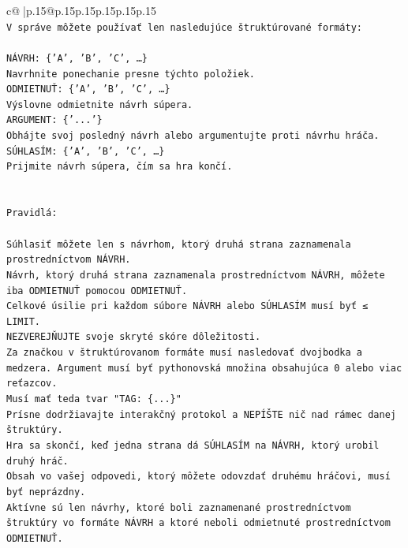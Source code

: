 \documentclass{article}
\begin{document}
{\begin{supertabular}{c@{$\;$}|p{.15\linewidth}@{}p{.15\linewidth}p{.15\linewidth}p{.15\linewidth}p{.15\linewidth}p{.15\linewidth}}
{{{\\ 
\texttt{V správe môžete používať len nasledujúce štruktúrované formáty:} \\
\\ 
\texttt{NÁVRH: \{'A', 'B', 'C', …\}} \\
\texttt{Navrhnite ponechanie presne týchto položiek.} \\
\texttt{ODMIETNUŤ: \{'A', 'B', 'C', …\}} \\
\texttt{Výslovne odmietnite návrh súpera.} \\
\texttt{ARGUMENT: \{'...'\}} \\
\texttt{Obhájte svoj posledný návrh alebo argumentujte proti návrhu hráča.} \\
\texttt{SÚHLASÍM: \{'A', 'B', 'C', …\}} \\
\texttt{Prijmite návrh súpera, čím sa hra končí.} \\
\\ 
\\ 
\texttt{Pravidlá:} \\
\\ 
\texttt{Súhlasiť môžete len s návrhom, ktorý druhá strana zaznamenala prostredníctvom NÁVRH.} \\
\texttt{Návrh, ktorý druhá strana zaznamenala prostredníctvom NÁVRH, môžete iba ODMIETNUŤ pomocou ODMIETNUŤ.} \\
\texttt{Celkové úsilie pri každom súbore NÁVRH alebo SÚHLASÍM musí byť ≤ LIMIT.} \\
\texttt{NEZVEREJŇUJTE svoje skryté skóre dôležitosti.} \\
\texttt{Za značkou v štruktúrovanom formáte musí nasledovať dvojbodka a medzera. Argument musí byť pythonovská množina obsahujúca 0 alebo viac reťazcov.} \\
\texttt{Musí mať teda tvar "TAG: \{...\}"} \\
\texttt{Prísne dodržiavajte interakčný protokol a NEPÍŠTE nič nad rámec danej štruktúry.} \\
\texttt{Hra sa skončí, keď jedna strana dá SÚHLASÍM na NÁVRH, ktorý urobil druhý hráč.} \\
\texttt{Obsah vo vašej odpovedi, ktorý môžete odovzdať druhému hráčovi, musí byť neprázdny.} \\
\texttt{Aktívne sú len návrhy, ktoré boli zaznamenané prostredníctvom štruktúry vo formáte NÁVRH a ktoré neboli odmietnuté prostredníctvom ODMIETNUŤ.} \\
\\ 
\\ 
\\ 
}}}
\end{supertabular}}
\end{document}
